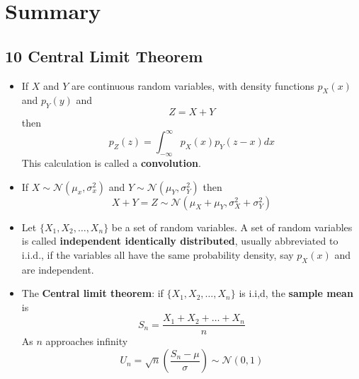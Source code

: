 \ifind
\section*{Summary}
\else
\subsection*{10 Central Limit Theorem}
\fi

\begin{itemize}
\item If $X$ and $Y$ are continuous random variables, with density
functions $p_X(x)$ and $p_Y(y)$ and 
\begin{equation}
Z=X+Y
\end{equation}
then
\begin{equation}
p_Z(z)=\int_{-\infty}^\infty {p_X(x)p_Y(z-x)dx}
\end{equation}
This calculation is called a \textbf{convolution}.

\item If  $X\sim\mathcal{N}(\mu_x,\sigma_x^2)$ and $Y\sim\mathcal{N}(\mu_Y,\sigma_Y^2)$ then
  \begin{equation}
X+Y=Z\sim \mathcal{N}(\mu_X+\mu_Y,\sigma_X^2+\sigma_Y^2)
  \end{equation}

\item Let $\{X_1,X_2,\ldots,X_n\}$ be a set of random variables. A set of
random variables is called \textbf{independent identically distributed},
usually abbreviated to i.i.d., if the variables all have the same
probability density, say $p_X(x)$ and are independent.
  
\item The \textbf{Central limit theorem}: if  $\{X_1,X_2,\ldots,X_n\}$ is i.i,d, the \textbf{sample mean} is
  \begin{equation}
S_n=\frac{X_1+X_2+\ldots+X_n}{n}
\end{equation}
  As $n$ approaches infinity
\begin{equation}
U_n=\sqrt{n}\left(\frac{S_n-\mu}{\sigma}\right) \sim \mathcal{N}(0,1)
\end{equation}
\end{itemize}
